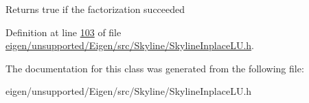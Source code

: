 \begin{DoxyReturn}{Returns}
true if the factorization succeeded 
\end{DoxyReturn}


Definition at line \hyperlink{eigen_2unsupported_2_eigen_2src_2_skyline_2_skyline_inplace_l_u_8h_source_l00103}{103} of file \hyperlink{eigen_2unsupported_2_eigen_2src_2_skyline_2_skyline_inplace_l_u_8h_source}{eigen/unsupported/\+Eigen/src/\+Skyline/\+Skyline\+Inplace\+L\+U.\+h}.



The documentation for this class was generated from the following file\+:\begin{DoxyCompactItemize}
\item 
eigen/unsupported/\+Eigen/src/\+Skyline/\+Skyline\+Inplace\+L\+U.\+h\end{DoxyCompactItemize}

